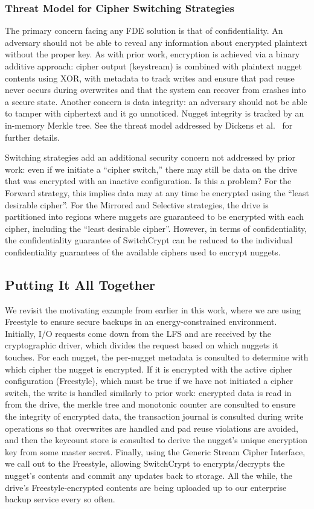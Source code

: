 \subsubsection{Threat Model for Cipher Switching Strategies}

The primary concern facing any FDE solution is that of confidentiality. An
adversary should not be able to reveal any information about encrypted plaintext
without the proper key. As with prior work, encryption is achieved via a binary
additive approach: cipher output (keystream) is combined with plaintext nugget
contents using XOR, with metadata to track writes and ensure that pad reuse
never occurs during overwrites and that the system can recover from crashes into
a secure state. Another concern is data integrity: an adversary should not be
able to tamper with ciphertext and it go unnoticed. Nugget integrity is tracked
by an in-memory Merkle tree. See the threat model addressed by Dickens et
al.~\cite{StrongBox} for further details.

Switching strategies add an additional security concern not addressed by prior
work: even if we initiate a ``cipher switch,'' there may still be data on the
drive that was encrypted with an inactive configuration. Is this a problem? For
the Forward strategy, this implies data may at any time be encrypted using the
``least desirable cipher''. For the Mirrored and Selective strategies, the drive
is partitioned into regions where nuggets are guaranteed to be encrypted with
each cipher, including the ``least desirable cipher''. However, in terms of
confidentiality, the confidentiality guarantee of SwitchCrypt can be reduced to
the individual confidentiality guarantees of the available ciphers used to
encrypt nuggets.

\subsection{Putting It All Together} \label{subsec:summary}

We revisit the motivating example from earlier in this work, where we are using
Freestyle to ensure secure backups in an energy-constrained environment.
Initially, I/O requests come down from the LFS and are received by the
cryptographic driver, which divides the request based on which nuggets it
touches. For each nugget, the per-nugget metadata is consulted to determine with
which cipher the nugget is encrypted. If it is encrypted with the active cipher
configuration (Freestyle), which must be true if we have not initiated a cipher
switch, the write is handled similarly to prior work: encrypted data is read in
from the drive, the merkle tree and monotonic counter are consulted to ensure
the integrity of encrypted data, the transaction journal is consulted during
write operations so that overwrites are handled and pad reuse violations are
avoided, and then the keycount store is consulted to derive the nugget's unique
encryption key from some master secret. Finally, using the Generic Stream Cipher
Interface, we call out to the Freestyle, allowing SwitchCrypt to
encrypts/decrypts the nugget's contents and commit any updates back to storage.
All the while, the drive's Freestyle-encrypted contents are being uploaded up to
our enterprise backup service every so often.

